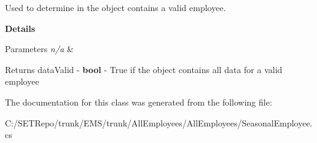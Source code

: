 Used to determine in the object contains a valid employee. 

{\bfseries Details}


\begin{DoxyParams}{Parameters}
{\em n/a} & \\
\hline
\end{DoxyParams}
\begin{DoxyReturn}{Returns}
data\+Valid -\/ {\bfseries bool} -\/ True if the object contains all data for a valid employee 
\end{DoxyReturn}


The documentation for this class was generated from the following file\+:\begin{DoxyCompactItemize}
\item 
C\+:/\+S\+E\+T\+Repo/trunk/\+E\+M\+S/trunk/\+All\+Employees/\+All\+Employees/Seasonal\+Employee.\+cs\end{DoxyCompactItemize}

